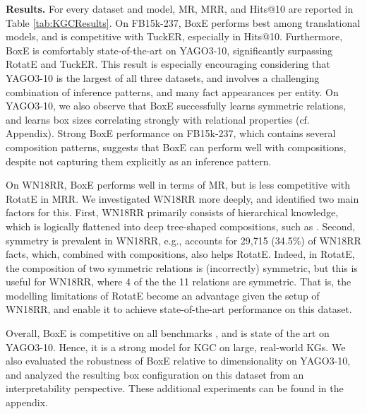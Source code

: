 \documentclass{article}
\begin{document}
\textbf{Results.} For every dataset and model, MR, MRR, and  Hits@10 are reported in Table \ref{tab:KGCResults}. On FB15k-237, BoxE performs best among translational models, and is competitive with TuckER, especially in Hits@10. 
Furthermore, BoxE is comfortably state-of-the-art on YAGO3-10, significantly surpassing RotatE and TuckER. This result is especially encouraging considering that YAGO3-10 is the largest of all three datasets, and involves a challenging combination of inference patterns, and many fact appearances per entity. On YAGO3-10, we also observe that BoxE successfully learns symmetric relations, and learns box sizes correlating strongly with relational properties (cf. Appendix). Strong BoxE performance on FB15k-237, which contains several composition patterns, suggests that BoxE can perform well with compositions, despite not capturing them explicitly as an inference pattern.

On WN18RR, BoxE performs well in terms of MR, but is less competitive with RotatE in MRR. We investigated WN18RR more deeply, and identified two main factors for this. First, WN18RR primarily consists of hierarchical knowledge, which is logically flattened into deep tree-shaped compositions, such as .
Second, symmetry is prevalent in WN18RR, e.g.,  accounts for 29,715 (34.5\%) of WN18RR facts, which, combined with compositions, also helps RotatE. Indeed, in RotatE, the composition of two symmetric relations is (incorrectly) symmetric, but this is useful for WN18RR, where 4 of the the 11 relations are symmetric. That is, the modelling limitations of RotatE become an advantage given the  setup of WN18RR, and enable it to achieve state-of-the-art performance on this dataset.
 
Overall, BoxE is competitive on all benchmarks , and is state of the art on YAGO3-10. Hence, it is a strong model for KGC on large, real-world KGs. We also evaluated the robustness of BoxE relative to dimensionality on YAGO3-10, and analyzed the resulting box configuration on this dataset from an interpretability perspective. These additional experiments can be found in the appendix.
\end{document}

